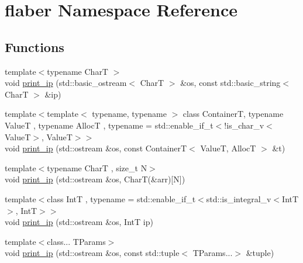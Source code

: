 \hypertarget{namespaceflaber}{\section{flaber Namespace Reference}
\label{namespaceflaber}
}
\subsection*{Functions}
\begin{DoxyCompactItemize}
\item 
{\footnotesize template$<$typename Char\-T $>$ }\\void \hyperlink{namespaceflaber_ac2e2220e0b43c7179450485776033a25}{print\-\_\-ip} (std\-::basic\-\_\-ostream$<$ Char\-T $>$ \&os, const std\-::basic\-\_\-string$<$ Char\-T $>$ \&ip)
\item 
{\footnotesize template$<$template$<$ typename, typename $>$ class Container\-T, typename Value\-T , typename Alloc\-T , typename  = std\-::enable\-\_\-if\-\_\-t$<$!is\-\_\-char\-\_\-v$<$\-Value\-T$>$, Value\-T$>$$>$ }\\void \hyperlink{namespaceflaber_a0a0f3ac76aaf479fde049bb26f0930ef}{print\-\_\-ip} (std\-::ostream \&os, const Container\-T$<$ Value\-T, Alloc\-T $>$ \&t)
\item 
{\footnotesize template$<$typename Char\-T , size\-\_\-t N$>$ }\\void \hyperlink{namespaceflaber_a899f2a8340371796390a26c56bd257c0}{print\-\_\-ip} (std\-::ostream \&os, Char\-T(\&arr)\mbox{[}N\mbox{]})
\item 
{\footnotesize template$<$class Int\-T , typename  = std\-::enable\-\_\-if\-\_\-t$<$std\-::is\-\_\-integral\-\_\-v$<$\-Int\-T$>$, Int\-T$>$$>$ }\\void \hyperlink{namespaceflaber_aa6c37128a4f8005fe33124a175e5df4e}{print\-\_\-ip} (std\-::ostream \&os, Int\-T ip)
\item 
{\footnotesize template$<$class... T\-Params$>$ }\\void \hyperlink{namespaceflaber_a2cd40a0efb0b9101246e8dcb11c6d18e}{print\-\_\-ip} (std\-::ostream \&os, const std\-::tuple$<$ T\-Params...$>$ \&tuple)
\end{DoxyCompactItemize}


